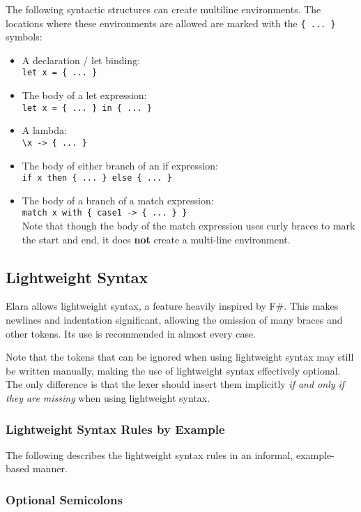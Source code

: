 \documentclass{article}
\begin{document}
The following syntactic structures can create multiline environments. The locations where these environments are allowed are marked with the \verb|{ ... }| symbols:
\begin{itemize}
    \item {A declaration / let binding: \\\verb|let x = { ... }|}
    \item {The body of a let expression: \\ \verb|let x = { ... } in { ... }|}
    \item {A lambda: \\\verb|\x -> { ... }|}
    \item {The body of either branch of an if expression:\\\verb|if x then { ... } else { ... }|}
    \item {The body of a branch of a match expression: \\\verb|match x with { case1 -> { ... } }|\\ Note that though the body of the match expression uses curly braces to mark the start and end, it does \textbf{not} create a multi-line environment.}
\end{itemize}

\subsection{Lightweight Syntax}
Elara allows lightweight syntax, a feature heavily inspired by F\#. This makes newlines and indentation significant, allowing the omission of many braces and other tokens.
Its use is recommended in almost every case.

Note that the tokens that can be ignored when using lightweight syntax may still be written manually, making the use of lightweight syntax effectively optional.
The only difference is that the lexer should insert them implicitly \emph{if and only if they are missing} when using lightweight syntax.

\subsubsection{Lightweight Syntax Rules by Example}
The following describes the lightweight syntax rules in an informal, example-based manner.

\subsubsection*{Optional Semicolons}
\end{document}
